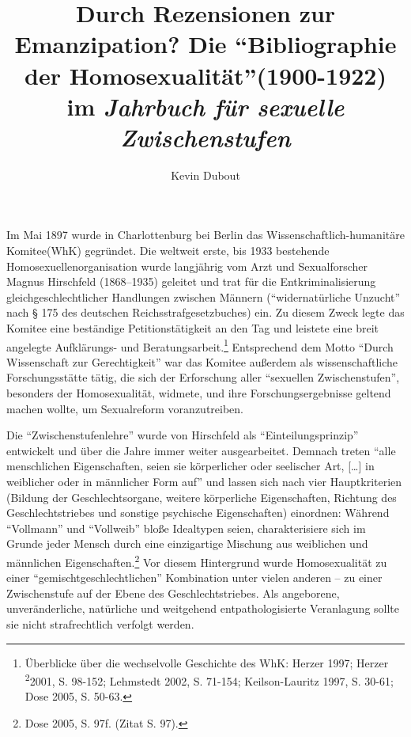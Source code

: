 \documentclass[a4paper,
fontsize=11pt,
oneside,
numbers=noperiodatend,
parskip=half-,
bibliography=totoc,
final
]{scrartcl}
\title{\LARGE{Durch Rezensionen zur Emanzipation? Die \enquote{Bibliographie der Homosexualität}(1900-1922) im \textit{Jahrbuch für sexuelle Zwischenstufen}}} %
\author{Kevin Dubout} %
\date{}
\begin{document}
\maketitle
\thispagestyle{fancyplain} 


Im Mai 1897 wurde in Charlottenburg bei Berlin das
Wissenschaftlich-humanitäre Ko\-mi\-tee\linebreak (WhK) gegründet. Die weltweit erste,
bis 1933 bestehende Homosexuellenorganisation wurde langjährig vom Arzt
und Sexualforscher Magnus Hirschfeld (1868--1935) geleitet und trat für
die Entkriminalisierung gleichgeschlechtlicher Handlungen zwischen
Männern (\enquote{widernatürliche Unzucht} nach § 175 des deutschen
Reichsstrafgesetzbuches) ein. Zu diesem Zweck legte das Komitee eine
beständige Petitionstätigkeit an den Tag und leistete eine breit
angelegte Aufklärungs- und Beratungsarbeit.\footnote{Überblicke über die
  wechselvolle Geschichte des WhK: Herzer 1997; Herzer
  \textsuperscript{2}2001, S. 98-152; Lehmstedt 2002, S. 71-154;
  Keilson-Lauritz 1997, S. 30-61; Dose 2005, S. 50-63.} Entsprechend dem
Motto \enquote{Durch Wissenschaft zur Gerechtigkeit} war das Komitee
außerdem als wissenschaftliche Forschungsstätte tätig, die sich der
Erforschung aller \enquote{sexuellen Zwischenstufen}, besonders der
Homosexualität, widmete, und ihre Forschungsergebnisse geltend machen
wollte, um Sexualreform voranzutreiben.

Die \enquote{Zwischenstufenlehre} wurde von Hirschfeld als
\enquote{Einteilungsprinzip} entwickelt und über die Jahre immer weiter
ausgearbeitet. Demnach treten \enquote{alle menschlichen Eigenschaften,
seien sie körperlicher oder seelischer Art, {[}\ldots{}{]} in weiblicher
oder in männlicher Form auf} und lassen sich nach vier Hauptkriterien
(Bildung der Geschlechtsorgane, weitere körperliche Eigenschaften,
Richtung des Geschlechtstriebes und sonstige psychische Eigenschaften)
einordnen: Während \enquote{Vollmann} und \enquote{Vollweib} bloße
Idealtypen seien, charakterisiere sich im Grunde jeder Mensch durch eine
einzigartige Mischung aus weiblichen und männlichen
Eigenschaften.\footnote{Dose 2005, S. 97f. (Zitat S. 97).} Vor diesem
Hintergrund wurde Homosexualität zu einer
\enquote{gemischtgeschlechtlichen} Kombination unter vielen anderen --
zu einer Zwischenstufe auf der Ebene des Geschlechtstriebes. Als
angeborene, unveränderliche, natürliche und weitgehend
entpathologisierte Veranlagung sollte sie nicht strafrechtlich verfolgt
werden.
\end{document}

